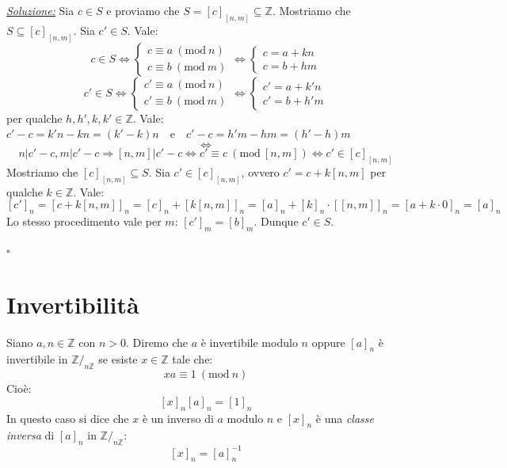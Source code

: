 \documentclass[oneside]{book}
\theoremstyle{remark}
\newcommand{\Mod}[1]{\ (\mathrm{mod}\ #1)} %
\newcommand{\cvd}{\begin{flushright}$\square$\end{flushright}} %
\begin{document}
\begin{tcolorbox}[title={Teorema cinese del resto}]
\underline{\emph{Soluzione:}} Sia $c \in S$ e proviamo che $S=[c]_{[n,m]} \subseteq \mathbb{Z}$.
Mostriamo che $S \subseteq [c]_{[n,m]}$. Sia $c'\in S$. Vale:
\[ c \in S \Longleftrightarrow
    \begin{cases}
        c \equiv a \Mod{n}\\
        c \equiv b \Mod{m}
    \end{cases}
    \Longleftrightarrow
    \begin{cases}
        c = a+kn\\
        c = b+hm
    \end{cases}
\]
\[
    c' \in S \Longleftrightarrow
    \begin{cases}
        c' \equiv a \Mod{n}\\
        c' \equiv b \Mod{m}
    \end{cases}
    \Longleftrightarrow
    \begin{cases}
        c' = a+k'n\\
        c' = b+h'm
    \end{cases}
\]
per qualche $h,h',k,k' \in \mathbb{Z}$. Vale:
$c'-c=k'n-kn=(k'-k)n \quad \text{e} \quad c'-c=h'm-hm=(h'-h)m$
\[ \Longleftrightarrow \]
\[ n|c'-c,m|c'-c \Longrightarrow [n,m]|c'-c \Longleftrightarrow c'\equiv c \Mod{[n,m]} \Longleftrightarrow c' \in [c]_{[n,m]} \]
Mostriamo che $[c]_{[n,m]} \subseteq S$. Sia $c' \in [c]_{[n,m]}$, ovvero $c'=c+k[n,m]$ per qualche
$k \in \mathbb{Z}$. Vale:
\[ [c']_n = [c+k[n,m]]_n = [c]_n + [k[n,m]]_n = [a]_n + [k]_n \cdot [[n,m]]_n = [a+k\cdot 0]_n = [a]_n \]
Lo stesso procedimento vale per $m$: $[c']_m = [b]_m$. Dunque $c'\in S$.
\cvd
\end{tcolorbox}

\section{Invertibilità}
\begin{tcolorbox}[colback=yellow!30, colframe=yellow!30!black, title=Invertibilità in modulo]
Siano $a,n \in \mathbb{Z}$ con $n>0$. Diremo che $a$ è invertibile modulo
$n$ oppure $[a]_n$ è invertibile in $\mathbb{Z}/_{n\mathbb{Z}}$ se esiste
$x \in \mathbb{Z}$ tale che: \[ xa \equiv 1 \Mod{n} \]
Cioè: \[ [x]_n[a]_n = [1]_n \]
In questo caso si dice che $x$ è un inverso di $a$ modulo $n$ e $[x]_n$ è
una \textit{classe inversa} di $[a]_n$ in $\mathbb{Z}/_{n\mathbb{Z}}$:
\[ [x]_n = [a]_n^{-1} \]
\end{tcolorbox}
\end{document}
